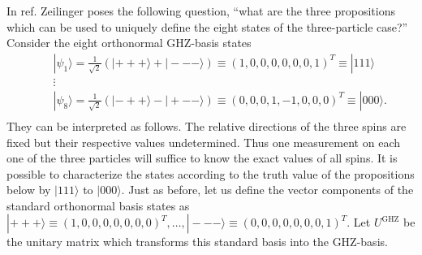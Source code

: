 In ref. \cite{zeil-99} Zeilinger poses the
following question, ``what are  the three propositions
which can be used to uniquely define the eight states of the three-particle case?''
Consider the eight orthonormal GHZ-basis states
\begin{eqnarray}
&&|\psi_1\rangle=\frac{1}{\sqrt{2}} \left( |+++\rangle+|---\rangle \right) \equiv (1,0,0,0,0,0,0,1)^T \equiv |111\rangle \nonumber \\
&&\vdots \nonumber \\
&&|\psi_8\rangle=\frac{1}{\sqrt{2}} \left( |-++\rangle-|+--\rangle \right) \equiv (0,0,0,1,-1,0,0,0)^T\equiv |000\rangle .\nonumber \\
\end{eqnarray}
They can be  interpreted as follows. The relative directions of the three spins are fixed
but their respective values undetermined. Thus one measurement on each one of the
three particles will suffice to know the exact
values of all spins.
It is possible to characterize the states according to the truth value of the propositions below
by $|111\rangle $ to $|000\rangle$.
Just as before, let us define the vector components of the standard orthonormal basis states
as
$|+++\rangle \equiv
(1,0,0,0,0,0,0,0)^T, \ldots ,
|---\rangle
\equiv
 (0,0,0,0,0,0,0,1)^T $.
Let $U^{\textrm{GHZ}}$ be the unitary matrix which transforms this standard basis
into the GHZ-basis.
